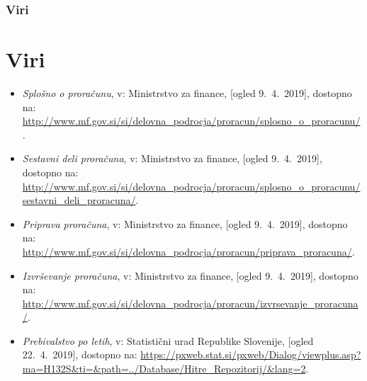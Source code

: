 \documentclass[10pt]{beamer}
\begin{document}
\begin{frame}
\frametitle{Viri}
\section[Viri]{Viri}
\begin{itemize}
\item
\label{Splošno o proračunu}
\emph{Splošno o proračunu}, v: Ministrstvo za finance, [ogled 9.~4.~2019], dostopno na: \url{http://www.mf.gov.si/si/delovna_podrocja/proracun/splosno_o_proracunu/}.

\item
\label{Sestavni deli}
\emph{Sestavni deli proračuna}, v: Ministrstvo za finance, [ogled 9.~4.~2019], dostopno na: \url{http://www.mf.gov.si/si/delovna_podrocja/proracun/splosno_o_proracunu/sestavni_deli_proracuna/}.

\item
\label{Priprava proračuna}
\emph{Priprava proračuna}, v: Ministrstvo za finance, [ogled 9.~4.~2019], dostopno na: \url{http://www.mf.gov.si/si/delovna_podrocja/proracun/priprava_proracuna/}.

\item
\label{Izvrševanje proračuna}
\emph{Izvrševanje proračuna}, v: Ministrstvo za finance, [ogled 9.~4.~2019], dostopno na: \url{http://www.mf.gov.si/si/delovna_podrocja/proracun/izvrsevanje_proracuna/}.

\item
\label{Prebivalstvo Slovenije}
\emph{Prebivalstvo po letih}, v: Statistični urad Republike Slovenije, [ogled 22.~4.~2019], dostopno na: \url{https://pxweb.stat.si/pxweb/Dialog/viewplus.asp?ma=H132S&ti=&path=../Database/Hitre_Repozitorij/&lang=2}.
\end{itemize}
\end{frame}
\end{document}
